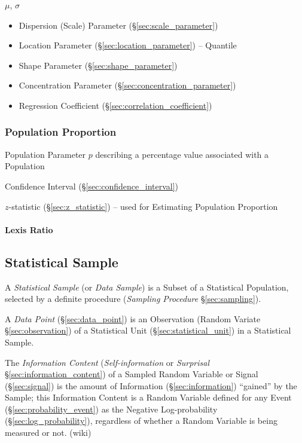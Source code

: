 $\mu$, $\sigma$

\begin{itemize}
  \item Dispersion (Scale) Parameter (\S\ref{sec:scale_parameter})
  \item Location Parameter (\S\ref{sec:location_parameter}) -- Quantile
  \item Shape Parameter (\S\ref{sec:shape_parameter})
  \item Concentration Parameter (\S\ref{sec:concentration_parameter})
  \item Regression Coefficient (\S\ref{sec:correlation_coefficient})
\end{itemize}



\subsubsection{Population Proportion}\label{sec:proportion}

Population Parameter $p$ describing a percentage value associated with a
Population

\fist Confidence Interval (\S\ref{sec:confidence_interval})

$z$-statistic (\S\ref{sec:z_statistic}) -- used for Estimating Population
Proportion



\paragraph{Lexis Ratio}\label{sec:lexis_ratio}\hfill



\subsection{Statistical Sample}\label{sec:sample}

A \emph{Statistical Sample} (or \emph{Data Sample}) is a Subset of a Statistical
Population, selected by a definite procedure (\emph{Sampling Procedure}
\S\ref{sec:sampling}).

\fist A \emph{Data Point} (\S\ref{sec:data_point}) is an Observation (Random
Variate \S\ref{sec:observation}) of a Statistical Unit
(\S\ref{sec:statistical_unit}) in a Statistical Sample.

The \emph{Information Content} (\emph{Self-information} or \emph{Surprisal}
\S\ref{sec:information_content}) of a Sampled Random Variable or Signal
(\S\ref{sec:signal}) is the amount of Information (\S\ref{sec:information})
``gained'' by the Sample; this Information Content is a Random Variable defined
for any Event (\S\ref{sec:probability_event}) as the Negative Log-probability
(\S\ref{sec:log_probability}), regardless of whether a Random Variable is being
measured or not. (wiki)

